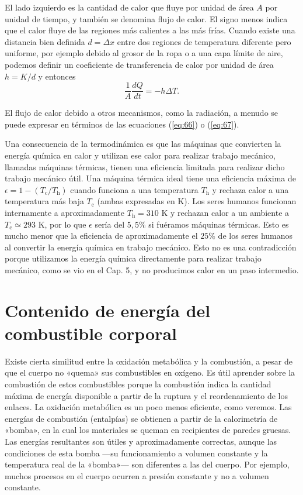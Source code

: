 \documentclass[12pt]{book}
\begin{document}
El lado izquierdo es la cantidad de calor que fluye por unidad de área $A$ por unidad de tiempo, y también se denomina flujo de calor. El signo menos indica que el calor fluye de las regiones más calientes a las más frías. Cuando existe una distancia bien definida $d = \Delta x$ entre dos regiones de temperatura diferente pero uniforme, por ejemplo debido al grosor de la ropa o a una capa límite de aire, podemos definir un coeficiente de transferencia de calor por unidad de área $h = K/d$ y entonces
\begin{equation}
\frac{1}{A} \frac{dQ}{dt} = -h \Delta T.
\label{eq:67}
\end{equation}

El flujo de calor debido a otros mecanismos, como la radiación, a menudo se puede expresar en términos de las ecuaciones (\ref{eq:66}) o (\ref{eq:67}).

Una consecuencia de la termodinámica es que las máquinas que convierten la energía química en calor y utilizan ese calor para realizar trabajo mecánico, llamadas máquinas térmicas, tienen una eficiencia limitada para realizar dicho trabajo mecánico útil. Una máquina térmica ideal tiene una eficiencia máxima de $\epsilon = 1 - (T_{\text{c}}/T_{\text{h}})$ cuando funciona a una temperatura $T_{\text{h}}$ y rechaza calor a una temperatura más baja $T_{\text{c}}$ (ambas expresadas en $\text{K}$). Los seres humanos funcionan internamente a aproximadamente $T_{\text{h}} = 310\text{ K}$ y rechazan calor a un ambiente a $T_{\text{c}} \simeq 293\text{ K}$, por lo que $\epsilon$ sería del $5,5\%$ si fuéramos máquinas térmicas. Esto es mucho menor que la eficiencia de aproximadamente el $25\%$ de los seres humanos al convertir la energía química en trabajo mecánico. Esto no es una contradicción porque utilizamos la energía química directamente para realizar trabajo mecánico, como se vio en el Cap. 5, y no producimos calor en un paso intermedio.

\section{Contenido de energía del combustible corporal}

Existe cierta similitud entre la oxidación metabólica y la combustión, a pesar de que el cuerpo no «quema» sus combustibles en oxígeno. Es útil aprender sobre la combustión de estos combustibles porque la combustión indica la cantidad máxima de energía disponible a partir de la ruptura y el reordenamiento de los enlaces. La oxidación metabólica es un poco menos eficiente, como veremos. Las energías de combustión (entalpías) se obtienen a partir de la calorimetría de «bomba», en la cual los materiales se queman en recipientes de paredes gruesas. Las energías resultantes son útiles y aproximadamente correctas, aunque las condiciones de esta bomba ---su funcionamiento a volumen constante y la temperatura real de la «bomba»--- son diferentes a las del cuerpo. Por ejemplo, muchos procesos en el cuerpo ocurren a presión constante y no a volumen constante.
\end{document}
